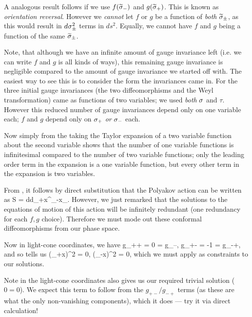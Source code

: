 \br 
A analogous result follows if we use $f(\widetilde{\sigma}_-)$ and $g(\widetilde{\sigma}_+)$. This is known as \textit{orientation reversal}. However we \textit{cannot} let $f$ or $g$ be a function of \textit{both} $\widetilde{\sigma}_{\pm}$, as this would result in $d\sigma_{\pm}^2$ terms in $ds^2$. Equally, we cannot have $f$ and $g$ being a function of the same $\widetilde{\sigma}_{\pm}$.
\er 

\br 
Note, that although we have an infinite amount of gauge invariance left (i.e. we can write $f$ and $g$ is all kinds of ways), this remaining gauge invariance is negligible compared to the amount of gauge invariance we started off with. The easiest way to see this is to consider the form the invariances came in. 
For the three initial gauge invariances (the two diffeomorphisms and the Weyl transformation) came as functions of two variables; we used \textit{both} $\sigma$ and $\tau$. However this reduced number of gauge invariances depend only on one variable each; $f$ and $g$ depend only on $\sigma_+$ \textit{or} $\sigma_-$ each. 

Now simply from the taking the Taylor expansion of a two variable function about the second variable shows that the number of one variable functions is infinitesimal compared to the number of two variable functions; only the leading order term in the expansion is a one variable function, but every other term in the expansion is two variables. 
\er 

From , it follows by direct substitution that the Polyakov action can be written as 
\be
\label{eqn:PolyakovActionLightcone}
    S = \int d\sig d\tau \p_+x^{\mu}\p_-x_{\mu}.
\ee 
However, we just remarked that the solutions to the equations of motion of this action will be infinitely redundant (one redundancy for each $f,g$ choice). Therefore we must mode out these conformal diffeomorphisms from our phase space. 

Now in light-cone coordinates, we have
\bse 
    g_{++} = 0 = g_{--}, \qquad g_{+-} = -1 = g_{-+},
\ese 
and so  tells us 
\be 
\label{eqn:PolyakovConstrainsLightcone}
    (\p_+x)^2  = 0, \qquad {} \qquad (\p_-x)^2  = 0,
\ee 
which we must apply as constraints to our solutions. 

\br 
Note  in the light-cone coordinates also gives us our required trivial solution ($0=0$). We expect this term to follow from the $g_{+-}/g_{-+}$ terms (as these are what the only non-vanishing components), which it does --- try it via direct calculation!
\er 

